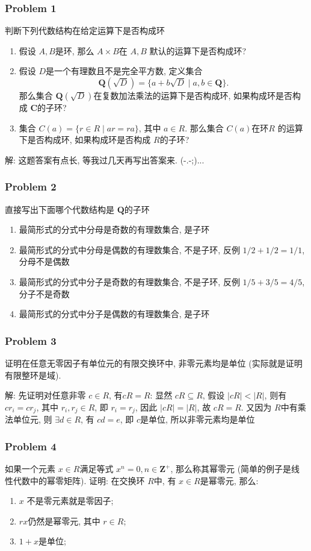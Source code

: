 \documentclass[a4paper,12pt]{ctexart}
\newcommand{\Z}{\mathbf{Z}}
\newcommand{\Com}{\mathbf{C}}
\newcommand{\Q}{\mathbf{Q}}
\begin{document}
\subsubsection*{Problem 1}
    判断下列代数结构在给定运算下是否构成环
    \begin{enumerate}
      \item 假设 $ A,B $是环, 那么 $ A\times B $在 $ A,B $ 默认的运算下是否构成环?
      \item 假设 $ D $是一个有理数且不是完全平方数, 定义集合
      \[\Q(\sqrt{D})=\{a+b\sqrt{D}\mid a,b\in\Q\}.\]
      那么集合 $ \Q(\sqrt{D}) $在复数加法乘法的运算下是否构成环, 如果构成环是否构成 $ \Com $的子环?
      \item 集合 $ C(a)=\{r\in R\mid ar=ra\} $, 其中 $ a\in R $. 那么集合 $ C(a) $在环$ R $ 的运算下是否构成环, 如果构成环是否构成 $ R $的子环?
    \end{enumerate}

    解: 这题答案有点长, 等我过几天再写出答案来. (-.-;)...
\subsubsection*{Problem 2}
   直接写出下面哪个代数结构是 $ \Q $的子环
   \begin{enumerate}
     \item 最简形式的分式中分母是奇数的有理数集合, 是子环
     \item 最简形式的分式中分母是偶数的有理数集合, 不是子环, 反例 $ 1/2+1/2=1/1 $, 分母不是偶数
     \item 最简形式的分式中分子是奇数的有理数集合, 不是子环, 反例 $ 1/5+3/5=4/5 $, 分子不是奇数
     \item 最简形式的分式中分子是偶数的有理数集合, 是子环
   \end{enumerate}
\subsubsection*{Problem 3}
    证明在任意无零因子有单位元的有限交换环中, 非零元素均是单位 (实际就是证明有限整环是域).

    解: 先证明对任意非零 $ c\in R $, 有$ cR=R $: 显然 $ cR\subseteq R $, 假设 $ |cR|<|R| $, 则有
    $ cr_i=cr_j $, 其中 $ r_i,r_j\in R $, 即 $ r_i=r_j $, 因此 $ |cR|=|R| $, 故 $ cR=R $.
    又因为 $ R $中有乘法单位元, 则 $ \exists d\in R $, 有 $ cd=e $, 即 $ c $是单位, 所以非零元素均是单位
\subsubsection*{Problem 4}
    如果一个元素 $ x\in R $满足等式 $ x^n=0,n\in\Z^+ $, 那么称其幂零元 (简单的例子是线性代数中的幂零矩阵). 证明: 在交换环 $ R $中,
    有 $ x\in R $是幂零元, 那么:
    \begin{enumerate}
      \item $ x $ 不是零元素就是零因子;
      \item $ rx $仍然是幂零元, 其中 $ r\in R $;
      \item $ 1+x $是单位; 
    \end{enumerate}
\end{document}
